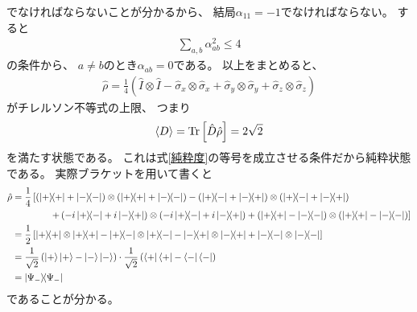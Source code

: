\documentclass[a4paper, 10pt]{jsarticle}
\begin{document}
でなければならないことが分かるから、
結局$\alpha_{11} = -1$でなければならない。
すると
\begin{align}
	\sum_{a,b} \alpha_{ab}^2 \leq 4
	\label{純粋度}
\end{align}
の条件から、
$a \neq b$のとき$\alpha_{ab} = 0$である。
以上をまとめると、
\begin{align}
	\hat{\rho} = \frac{1}{4} \left( \hat{I} \otimes \hat{I}
	- \hat{\sigma}_{x} \otimes \hat{\sigma}_x
	+ \hat{\sigma}_y \otimes \hat{\sigma}_y
	+ \hat{\sigma}_z \otimes \hat{\sigma}_z \right)
\end{align}
がチレルソン不等式の上限、
つまり
\begin{align}
	\Braket{D} = \operatorname*{Tr} \left[ \hat{D} \hat{\rho} \right]
	= 2\sqrt{2}
\end{align}
を満たす状態である。
これは式\eqref{純粋度}の等号を成立させる条件だから純粋状態である。
実際ブラケットを用いて書くと
\begin{align}
	\hat{\rho}
	&= \frac{1}{4} \left[ \left( \Ketbra{+}{+} + \Ketbra{-}{-} \right)
	\otimes \left( \Ketbra{+}{+} + \Ketbra{-}{-} \right)
	- \left( \Ketbra{+}{-} + \Ketbra{-}{+} \right) \otimes
	\left( \Ketbra{+}{-} + \Ketbra{-}{+} \right) \right. \\
	&\qquad \qquad \left.
	+ \left( -i \Ketbra{+}{-} +i \Ketbra{-}{+} \right) \otimes
	\left( -i \Ketbra{+}{-} +i \Ketbra{-}{+} \right)
	+ \left( \Ketbra{+}{+} - \Ketbra{-}{-} \right) \otimes
	\left( \Ketbra{+}{+} - \Ketbra{-}{-} \right) \right] \\
	&= \frac{1}{2} \left[ \Ketbra{+}{+} \otimes \Ketbra{+}{+}
	- \Ketbra{+}{-} \otimes \Ketbra{+}{-}
	- \Ketbra{-}{+} \otimes \Ketbra{-}{+}
	+ \Ketbra{-}{-} \otimes \Ketbra{-}{-} \right] \\
	&= \frac{1}{\sqrt{2}} \left( \Ket{+} \Ket{+} - \Ket{-} \Ket{-} \right)
	\cdot \frac{1}{\sqrt{2}} \left( \Bra{+} \Bra{+} - \Bra{-} \Bra{-} \right)
	\\
	&= \Ketbra{\Psi_-}{\Psi_-}
\end{align}
であることが分かる。
\end{document}
